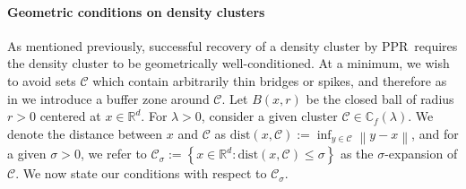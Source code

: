 \documentclass{article}
\newcommand{\set}[1]{\left\{#1\right\}}
\newcommand{\Reals}{\mathbb{R}}
\newcommand{\Rd}{\Reals^d}
\newcommand{\norm}[1]{\left\lVert#1\right\rVert}
\newcommand{\1}{\mathbf{1}}
\newcommand{\dist}{\mathrm{dist}}
\newcommand{\Cbb}{\mathbb{C}}
\newcommand{\Cset}{\mathcal{C}}
\newcommand{\Csig}{\Cset_{\sigma}}
\newcommand{\pprspace}{{\sc PPR~}}
\theoremstyle{aldenthm}
\theoremstyle{aldenrmrk}
\begin{document}
\paragraph{Geometric conditions on density clusters}

As mentioned previously, successful recovery of a density cluster by \pprspace requires the density cluster to be geometrically well-conditioned. At a minimum, we wish to avoid sets $\Cset$ which contain arbitrarily thin bridges or spikes, and therefore as in \cite{chaudhuri2010} we introduce a buffer zone around $\Cset$. Let $B(x,r)$ be the closed ball of radius $r > 0$ centered at $x \in \Rd$. For $\lambda > 0$, consider a given cluster $\Cset \in \Cbb_f(\lambda)$. We denote the distance between $x$ and $\Cset$ as $\dist(x,\Cset) := \inf_{y \in \Cset} \norm{y - x}$, and for a given $\sigma > 0$, we refer to $\Csig := \set{x \in \Reals^d: \dist(x,\Cset) \leq \sigma}$ as the $\sigma$-expansion of $\Cset$. We now state our conditions with respect to $\Csig$.
\end{document}
